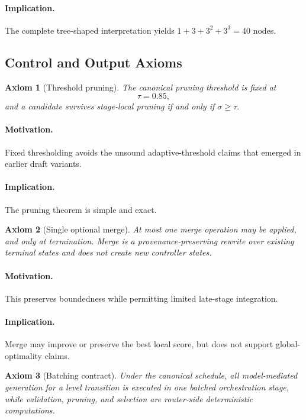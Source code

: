 \documentclass[11pt,a4paper]{article}
\numberwithin{equation}{section}
\newtheorem{axiom}{Axiom}[section]
\theoremstyle{definition}
\begin{document}
\paragraph{Implication.}
The complete tree-shaped interpretation yields \(1+3+3^2+3^3=40\) nodes.

\subsection{Control and Output Axioms}

\begin{axiom}[Threshold pruning]
The canonical pruning threshold is fixed at
\[
\tau=0.85,
\]
and a candidate survives stage-local pruning if and only if \(\sigma\ge \tau\).
\end{axiom}

\paragraph{Motivation.}
Fixed thresholding avoids the unsound adaptive-threshold claims that emerged in earlier draft variants.

\paragraph{Implication.}
The pruning theorem is simple and exact.

\begin{axiom}[Single optional merge]
At most one merge operation may be applied, and only at termination. Merge is a provenance-preserving rewrite over existing terminal states and does not create new controller states.
\end{axiom}

\paragraph{Motivation.}
This preserves boundedness while permitting limited late-stage integration.

\paragraph{Implication.}
Merge may improve or preserve the best local score, but does not support global-optimality claims.

\begin{axiom}[Batching contract]
Under the canonical schedule, all model-mediated generation for a level transition is executed in one batched orchestration stage, while validation, pruning, and selection are router-side deterministic computations.
\end{axiom}
\end{document}
